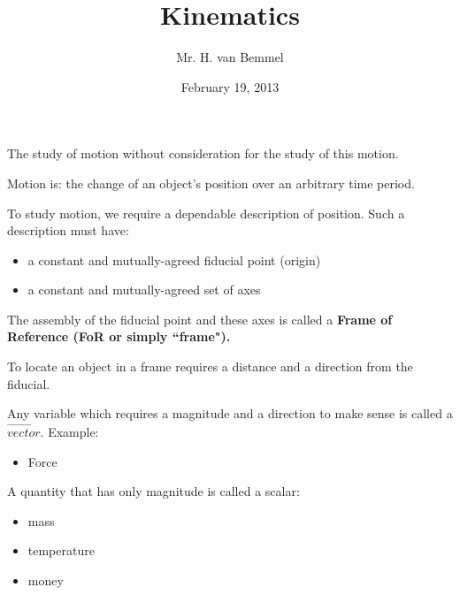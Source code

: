 \documentclass[12pt]{article}
\begin{document}
\title{Kinematics}
\author{Mr. H. van Bemmel}
\date{February 19, 2013}
\maketitle

The study of motion without consideration for the study of this motion.

Motion is: the change of an object's position over an arbitrary time period.

To study motion, we require a dependable description of position.
Such a description must have:
\begin{itemize}
    \item a constant and mutually-agreed fiducial point (origin)
    \item a constant and mutually-agreed set of axes
\end{itemize}
The assembly of the fiducial point and these axes is called a \bf Frame of Reference \rm (FoR or simply ``frame").

To locate an object in a frame requires a distance and a direction from the fiducial.

Any variable which requires a magnitude and a direction to make sense is called a $\vec{vector}$.
Example:
\begin {itemize}
    \item Force
\end{itemize}

A quantity that has only magnitude is called a scalar:
\begin{itemize}
    \item mass
    \item temperature
    \item money
\end{itemize}
\end{document}
